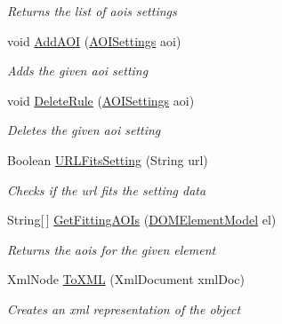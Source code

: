 \begin{DoxyCompactItemize}
\begin{DoxyCompactList}\small\item\em Returns the list of aois settings \end{DoxyCompactList}\item 
void \hyperlink{class_web_analyzer_1_1_models_1_1_settings_model_1_1_domain_settings_a339c77553bc0005a04e1f054f78d4e16}{Add\+A\+O\+I} (\hyperlink{class_web_analyzer_1_1_models_1_1_settings_model_1_1_a_o_i_settings}{A\+O\+I\+Settings} aoi)
\begin{DoxyCompactList}\small\item\em Adds the given aoi setting \end{DoxyCompactList}\item 
void \hyperlink{class_web_analyzer_1_1_models_1_1_settings_model_1_1_domain_settings_ab2f91f58d7deeaabda24138cb92999e9}{Delete\+Rule} (\hyperlink{class_web_analyzer_1_1_models_1_1_settings_model_1_1_a_o_i_settings}{A\+O\+I\+Settings} aoi)
\begin{DoxyCompactList}\small\item\em Deletes the given aoi setting \end{DoxyCompactList}\item 
Boolean \hyperlink{class_web_analyzer_1_1_models_1_1_settings_model_1_1_domain_settings_a19cfec6016d0dbfe5a3b5a73efca93df}{U\+R\+L\+Fits\+Setting} (String url)
\begin{DoxyCompactList}\small\item\em Checks if the url fits the setting data \end{DoxyCompactList}\item 
String\mbox{[}$\,$\mbox{]} \hyperlink{class_web_analyzer_1_1_models_1_1_settings_model_1_1_domain_settings_af25051da84e5c45e90ae3425963ed800}{Get\+Fitting\+A\+O\+Is} (\hyperlink{class_web_analyzer_1_1_models_1_1_data_model_1_1_d_o_m_element_model}{D\+O\+M\+Element\+Model} el)
\begin{DoxyCompactList}\small\item\em Returns the aois for the given element \end{DoxyCompactList}\item 
Xml\+Node \hyperlink{class_web_analyzer_1_1_models_1_1_settings_model_1_1_domain_settings_a493458b4a083d0aca8d573612c578e7f}{To\+X\+M\+L} (Xml\+Document xml\+Doc)
\begin{DoxyCompactList}\small\item\em Creates an xml representation of the object \end{DoxyCompactList}\end{DoxyCompactItemize}
